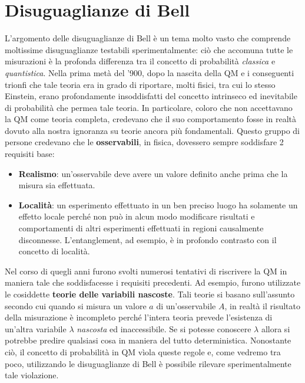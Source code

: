 \section{Disuguaglianze di Bell}
L'argomento delle disuguaglianze di Bell è un tema molto vasto che comprende moltissime disuguaglianze testabili sperimentalmente: ciò che accomuna tutte le misurazioni è la profonda differenza tra il concetto di probabilità \textit{classica} e \textit{quantistica}. Nella prima metà del '900, dopo la nascita della QM e i conseguenti trionfi che tale teoria era in grado di riportare, molti fisici, tra cui lo stesso Einstein, erano profondamente insoddisfatti del concetto intrinseco ed inevitabile di probabilità che permea tale teoria. In particolare, coloro che non accettavano la QM come teoria completa, credevano che il suo comportamento fosse in realtà dovuto alla nostra ignoranza su teorie ancora più fondamentali. Questo gruppo di persone credevano che le \textbf{osservabili}, in fisica, dovessero sempre soddisfare 2 requisiti base:
\begin{itemize}
    \item \textbf{Realismo}: un'osservabile deve avere un valore definito anche prima che la misura sia effettuata.
    
    \item \textbf{Località}: un esperimento effettuato in un ben preciso luogo ha solamente un effetto locale perché non può in alcun modo modificare risultati e comportamenti di altri esperimenti effettuati in regioni causalmente disconnesse. L'entanglement, ad esempio, è in profondo contrasto con il concetto di località. 
\end{itemize}

\noindent Nel corso di quegli anni furono svolti numerosi tentativi di riscrivere la QM in maniera tale che soddisfacesse i requisiti precedenti. Ad esempio, furono utilizzate le cosiddette \textbf{teorie delle variabili nascoste}. Tali teorie si basano sull'assunto secondo cui quando si misura un valore $a$ di un'osservabile $A$, in realtà il risultato della misurazione è incompleto perché l'intera teoria prevede l'esistenza di un'altra variabile $\lambda$ \textit{nascosta} ed inaccessibile. Se si potesse conoscere $\lambda$ allora si potrebbe predire qualsiasi cosa in maniera del tutto deterministica. Nonostante ciò, il concetto di probabilità in QM vìola queste regole e, come vedremo tra poco, utilizzando le disuguaglianze di Bell è possibile rilevare sperimentalmente tale violazione. 

